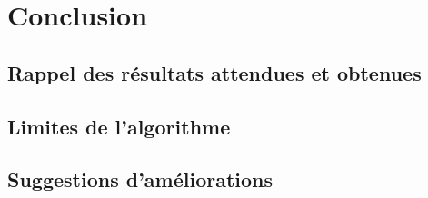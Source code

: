 \section{Conclusion}
\subsection{Rappel des résultats attendues et obtenues}
\subsection{Limites de l'algorithme}
\subsection{Suggestions d'améliorations}